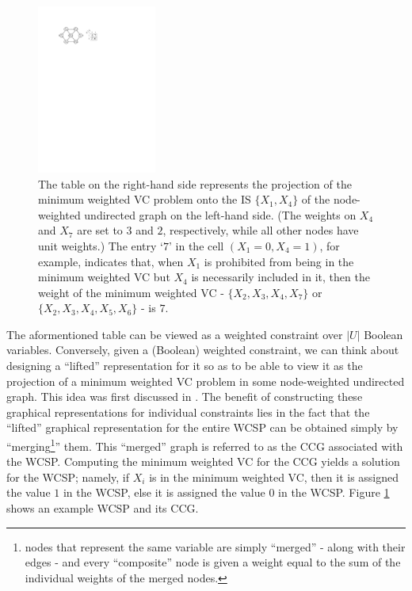 \begin{figure}[t]
  \centering
  \includegraphics[width=0.35\textwidth]{figs/fig5}
  \caption{The table on the right-hand side represents the projection of the minimum weighted VC problem onto the IS $\{ X_1, X_4 \}$ of the node-weighted undirected graph on the left-hand side. (The weights on $X_4$ and $X_7$ are set to $3$ and $2$, respectively, while all other nodes have unit weights.) The entry `$7$' in the cell $(X_1=0, X_4=1)$, for example, indicates that, when $X_1$ is prohibited from being in the minimum weighted VC but $X_4$ is necessarily included in it, then the weight of the minimum weighted VC - $\{ X_2, X_3, X_4, X_7 \}$ or $\{ X_2, X_3, X_4, X_5, X_6 \}$ - is $7$.}
  \label{VC_example}
\end{figure}

  The aformentioned table can be viewed as a weighted constraint over $|U|$ Boolean variables. Conversely, given a (Boolean) weighted constraint, we can think about designing a ``lifted'' representation for it so as to be able to view it as the projection of a minimum weighted VC problem in some node-weighted undirected graph. This idea was first discussed in \cite{K:ISAIM:08}. The benefit of constructing these graphical representations for individual constraints lies in the fact that the ``lifted'' graphical representation for the entire WCSP can be obtained simply by ``merging\footnote{nodes that represent the same variable are simply ``merged'' - along with their edges - and every ``composite'' node is given a weight equal to the sum of the individual weights of the merged nodes.}'' them. This ``merged'' graph is referred to as the CCG associated with the WCSP. Computing the minimum weighted VC for the CCG yields a solution for the WCSP; namely, if $X_i$ is in the minimum weighted VC, then it is assigned the value $1$ in the WCSP, else it is assigned the value $0$ in the WCSP. Figure \ref{VC_example} shows an example WCSP and its CCG.
  
